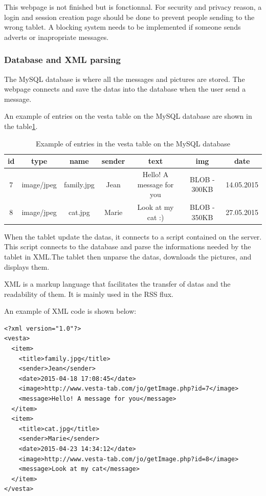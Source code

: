 This webpage is not finished but is fonctionnal. For security and privacy reason, a login and session creation page should be done to prevent people sending to the wrong tablet. A blocking system needs to be implemented if someone sends adverts or inapropriate messages.

\clearpage

\subsubsection{Database and XML parsing}
The MySQL database is where all the messages and pictures are stored. The webpage connects and save the datas into the database when the user send a message.

An example of entries on the vesta table on the MySQL database are shown in the table\ref{tab:database}.

\begin{table}
\begin{tabular}{|c|c|c|c|c|c|c|}
  \hline
  id & type & name & sender & text & img & date \\
  \hline
  7 & image/jpeg & family.jpg & Jean & Hello! A message for you & BLOB - 300KB & 14.05.2015\\
  8 & image/jpeg & cat.jpg & Marie & Look at my cat :) & BLOB - 350KB & 27.05.2015\\
  \hline
\end{tabular}
\caption {Example of entries in the vesta table on the MySQL database}\label{tab:database}
\end{table}

When the tablet update the datas, it connects to a script contained on the server. This script connects to the database and parse the informations needed by the tablet in XML.The tablet then unparse the datas, downloads the pictures, and displays them.

XML is a markup language that facilitates the transfer of datas and the readability of them. It is mainly used in the RSS flux.


An example of XML code is shown below:



\begin{lstlisting}
<?xml version="1.0"?>
<vesta>
  <item>
    <title>family.jpg</title>
    <sender>Jean</sender>
    <date>2015-04-18 17:08:45</date>    
    <image>http://www.vesta-tab.com/jo/getImage.php?id=7</image>
    <message>Hello! A message for you</message>
  </item>
  <item>
    <title>cat.jpg</title>
    <sender>Marie</sender>
    <date>2015-04-23 14:34:12</date>
    <image>http://www.vesta-tab.com/jo/getImage.php?id=8</image>
    <message>Look at my cat</message>
  </item>
</vesta>
\end{lstlisting}

